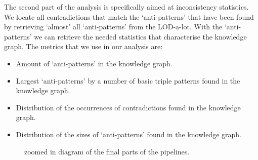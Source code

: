 \documentclass{article}
\begin{document}
The second part of the analysis is specifically aimed at inconsistency statistics. We locate all contradictions that match the `anti-patterns' that have been found by retrieving `almost' all `anti-patterns' from the LOD-a-lot. With the `anti-patterns' we can retrieve the needed statistics that characterise the knowledge graph. The metrics that we use in our analysis are:
\begin{itemize}
	\item Amount of `anti-patterns' in the knowledge graph.
	\item Largest `anti-patterns' by a number of basic triple patterns found in the knowledge graph.
	\item Distribution of the occurrences of contradictions found in the knowledge graph.
	\item Distribution of the sizes of `anti-patterns' found in the knowledge graph.
\end{itemize} 

\begin{figure}[!t]
	\hfill
	\caption{zoomed in diagram of the final parts of the pipelines.}
	\label{fig:PipelinePart45}
\end{figure}
\end{document}
